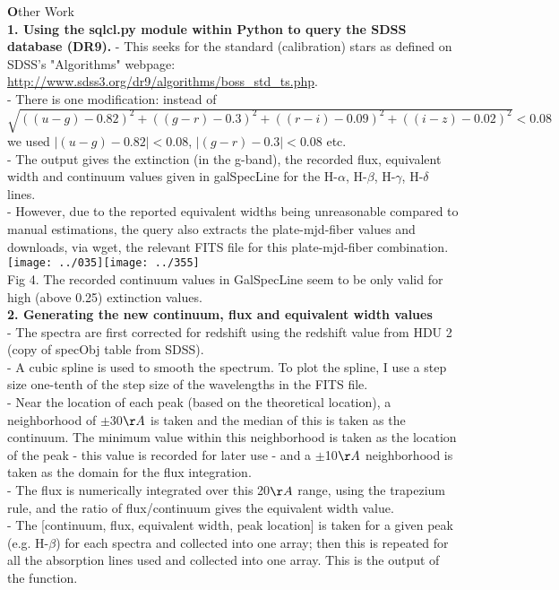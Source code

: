 \documentclass[12pt]{article}
\begin{document}
{\LARGE \textbf Other Work} \\
\textbf {1. Using the sqlcl.py module within Python to query the SDSS database (DR9).}
- This seeks for the standard (calibration) stars as defined on SDSS's "Algorithms" webpage: \url{http://www.sdss3.org/dr9/algorithms/boss_std_ts.php}. \\
- There is one modification: instead of \\ $\sqrt{((u-g)-0.82)^2+((g-r)-0.3)^2+((r-i)-0.09)^2+((i-z)-0.02)^2}<0.08$ we used $|(u-g)-0.82|<0.08$, $|(g-r)-0.3|<0.08$ etc. \\
- The output gives the extinction (in the g-band), the recorded flux, equivalent width and continuum values given in galSpecLine for the H-$\alpha$, H-$\beta$, H-$\gamma$, H-$\delta$ lines. \\
- However, due to the reported equivalent widths being unreasonable compared to manual estimations, the query also extracts the plate-mjd-fiber values and downloads, via wget, the relevant FITS file for this plate-mjd-fiber combination. \\
\texttt{[image: ../035]}\texttt{[image: ../355]}\\
Fig 4. The recorded continuum values in GalSpecLine seem to be only valid for high (above 0.25) extinction values.\\
\textbf{2. Generating the new continuum, flux and equivalent width values}\\
- The spectra are first corrected for redshift using the redshift value from HDU 2 (copy of specObj table from SDSS).\\
- A cubic spline is used to smooth the spectrum. To plot the spline, I use a step size one-tenth of the step size of the wavelengths in the FITS file. \\
- Near the location of each peak (based on the theoretical location), a neighborhood of $\pm$30$\AA$ is taken and the median of this is taken as the continuum. The minimum value within this neighborhood is taken as the location of the peak - this value is recorded for later use - and a $\pm$10$\AA$ neighborhood is taken as the domain for the flux integration.\\
- The flux is numerically integrated over this 20$\AA$ range, using the trapezium rule, and the ratio of flux/continuum gives the equivalent width value.\\
- The [continuum, flux, equivalent width, peak location] is taken for a given peak (e.g. H-$\beta$) for each spectra and collected into one array; then this is repeated for all the absorption lines used and collected into one array. This is the output of the function. \\
\end{document}
